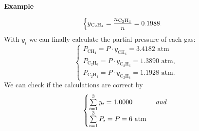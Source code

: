 \begin{MyExample}{\begin{center}{\bf Example}\end{center}}
\begin{displaymath}
\begin{cases}
           y_{\text{C}_{2}\text{H}_{4}} = \frc{n_{\text{C}_{2}\text{H}_{4}}}{n} = 0.1988. 
         \end{cases}
       \end{displaymath}
       With $y_{i}$ we can finally calculate the partial pressure of each gas:
       \begin{displaymath}
         \begin{cases}
           P_{\text{CH}_{4}} = P\cdot y_{\text{CH}_{4}} = 3.4182\text{ atm}  \\
           P_{\text{C}_{2}\text{H}_{6}} = P\cdot y_{\text{C}_{2}\text{H}_{6}} = 1.3890\text{ atm},  \\
           P_{\text{C}_{2}\text{H}_{4}} = P\cdot y_{\text{C}_{2}\text{H}_{4}} = 1.1928\text{ atm}. 
         \end{cases}
       \end{displaymath}
       We can check if the calculations are correct by
       \begin{displaymath}
         \begin{cases}
           \summation[y_{i}]{i=1}{3} = 1.0000  & \textit{ and } \\
           \summation[P_{i}]{i=1}{3} = P = 6\text{ atm} & \\
         \end{cases}
       \end{displaymath}
           
   \end{MyExample}


